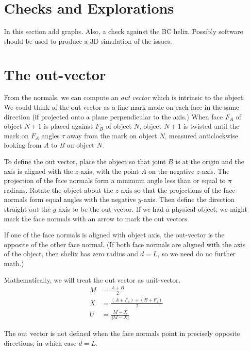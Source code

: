\documentclass[11pt]{article}
\begin{document}
{\section{Checks and Explorations}

In this section add graphs. Also, a check against the BC helix.
Possibly software should be used to produce a 3D simulation
of the issues.

\section{The out-vector}

From the normals, we can compute an {\em out vector} which is intrinsic to the object.
We could think of the out vector as a fine mark made on each face in the same direction
(if projected onto a plane perpendicular to the axis.) When face $F_A$ of object $N+1$
is placed against $F_B$ of object $N$, object $N+1$ is twisted until the mark on $F_A$ angles
$\tau$ away from the mark on object $N$, measured anticlockwise looking from $A$ to $B$ on
object $N$.

To define the out vector, place the object so that joint $B$ is at the origin and the
axis is aligned with the $z$-axis, with the point $A$ on the negative $z$-axis.
The projection of the face normals form a minimum angle less than or equal to $\pi$
radians. Rotate the object about the $z$-axis so that the projections of the face normals
form equal angles with the negative $y$-axis. Then define the direction straight out
the $y$ axis to be the out vector. If we had a physical object, we might mark the face
normals with an arrow to mark the out vectors.

If one of the face normals is aligned with object axis, the out-vector is the opposite
of the other face normal. (If both face normals are aligned with the axis of the object,
then shelix has zero radius and $d = L$, so we need do no further math.)

Mathematically, we will treat the out vector as unit-vector.
\begin{align}
  M &= \frac{A+B}{2} \\
  X &= \frac{(A+F_a) + (B+F_b)}{2} \\
  U &= \frac{M - X}{\Vert M - X \Vert}
\end{align}

The out vector is not defined when the face normals point in precisely opposite directions,
in which case $d = L$.

}
\end{document}
